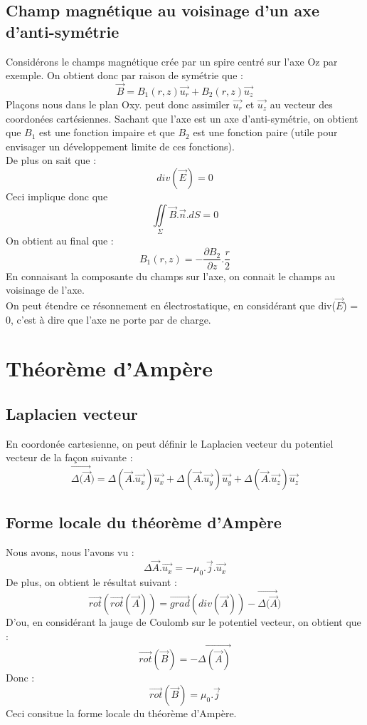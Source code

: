 \section{Champ magnétique au voisinage d'un axe d'anti-symétrie}
Considérons le champs magnétique crée par un spire centré sur l'axe Oz par exemple. On obtient donc par raison de symétrie que :
$$\overrightarrow{B} = B_1(r,z)\overrightarrow{u_r}+B_2(r,z)\overrightarrow{u_z}$$
Plaçons nous dans le plan Oxy. peut donc assimiler $\overrightarrow{u_r}$ et $\overrightarrow{u_z}$ au vecteur des coordonées cartésiennes. Sachant que l'axe est un axe d'anti-symétrie, on obtient que $B_1$ est une fonction impaire et que $B_2$ est une fonction paire (utile pour envisager un développement limite de ces fonctions).\\
De plus on sait que : 
$$div(\overrightarrow{E}) = 0$$
Ceci implique donc que 
$$\underset{\Sigma}\iint \overrightarrow{B}.\overrightarrow{n}.dS = 0$$
On obtient au final que : 
$$B_1(r,z) = -\dfrac{\partial B_2}{\partial z}.\dfrac{r}{2}$$
En connaisant la composante du champs sur l'axe, on connait le champs au voisinage de l'axe.\\
On peut étendre ce résonnement en électrostatique, en considérant que div($\overrightarrow{E}$) = 0, c'est à dire que l'axe ne porte par de charge.
\chapter{Théorème d'Ampère}
\section{Laplacien vecteur}
En coordonée cartesienne, on peut définir le Laplacien vecteur du potentiel vecteur de la façon suivante : 
$$\overrightarrow{\Delta(\overrightarrow{A}}) = \Delta(\overrightarrow{A}.\overrightarrow{u_x})\overrightarrow{u_x}+\Delta(\overrightarrow{A}.\overrightarrow{u_y})\overrightarrow{u_y}+\Delta(\overrightarrow{A}.\overrightarrow{u_z})\overrightarrow{u_z}$$
\section{Forme locale du théorème d'Ampère}
\begin{theo}
Nous avons, nous l'avons vu : 
$$\Delta \overrightarrow{A}.\overrightarrow{u_x} = -\mu_0.\overrightarrow{j}.\overrightarrow{u_x}$$
De plus, on obtient le résultat suivant :
$$\overrightarrow{rot}(\overrightarrow{rot}(\overrightarrow{A})) = \overrightarrow{grad}(div(\overrightarrow{A})) - \overrightarrow{\Delta(\overrightarrow{A}})$$
D'ou, en considérant la jauge de Coulomb sur le potentiel vecteur, on obtient que : 
$$\overrightarrow{rot}(\overrightarrow{B}) = -\overrightarrow{\Delta(\overrightarrow{A})}$$
Donc : 
$$\overrightarrow{rot}(\overrightarrow{B}) = \mu_0.\overrightarrow{j}$$
Ceci consitue la forme locale du théorème d'Ampère.
\end{theo}
